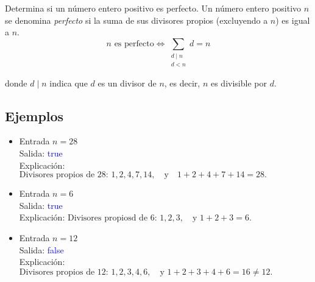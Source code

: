 Determina si un número entero positivo es perfecto. Un número entero positivo \( n \) se denomina \textit{perfecto} si la suma de sus divisores propios (excluyendo a \( n \)) es igual a \( n \).
\[
n \text{ es perfecto} \iff \sum_{\substack{d \mid n \\ d < n}} d = n
\]

donde \( d \mid n \) indica que \( d \) es un divisor de \( n \), es decir, \( n \) es divisible por \( d \). 

\subsection*{Ejemplos}
\begin{itemize}
    \item Entrada \( n = 28 \)\\
    Salida: \textcolor{blue}{true}\\
    Explicación:
    \(
    \text{Divisores propios de 28: } 1, 2, 4, 7, 14, \quad \text{y} \quad 1 + 2 + 4 + 7 + 14 = 28.
    \)
    
    \item Entrada \( n = 6 \)\\
    Salida: \textcolor{blue}{true}\\
    Explicación:
    \(
    \text{Divisores propiosd de 6: } 1, 2, 3, \quad \text{y } 1 + 2 + 3 = 6.
    \)

    \item Entrada \( n = 12 \)\\
    Salida: \textcolor{blue}{false}\\
    Explicación:
    \(
    \text{Divisores propios de 12: } 1, 2, 3, 4, 6, \quad \text{y } 1 + 2 + 3 + 4 + 6 = 16 \neq 12.
    \)
\end{itemize}
